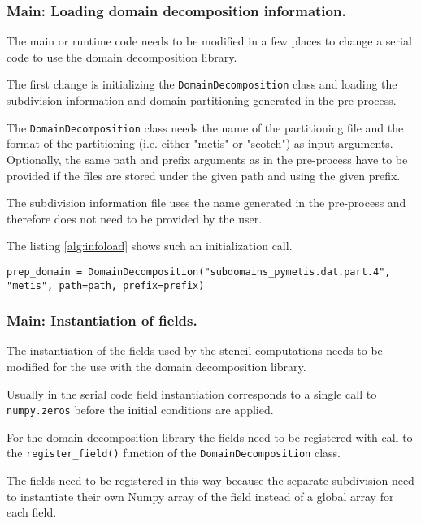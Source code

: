 \subsubsection{Main: Loading domain decomposition information.}
The main or runtime code needs to be modified in a few places to change a serial code to use the domain decomposition library.

The first change is initializing the \texttt{DomainDecomposition} class and loading the subdivision information and domain partitioning generated in the pre-process.

The \texttt{DomainDecomposition} class needs the name of the partitioning file and the format of the partitioning (i.e. either "metis" or "scotch") as input arguments.
Optionally, the same path and prefix arguments as in the pre-process have to be provided if the files are stored under the given path and using the given prefix.

The subdivision information file uses the name generated in the pre-process and therefore does not need to be provided by the user.

The listing \ref{alg:infoload} shows such an initialization call.

\begin{lstlisting}[caption={Example code for the loading of the domain decomposition information.},captionpos=b, label={alg:infoload}, float, floatplacement=H]
prep_domain = DomainDecomposition("subdomains_pymetis.dat.part.4", "metis", path=path, prefix=prefix)
\end{lstlisting}

\subsubsection{Main: Instantiation of fields.}
The instantiation of the fields used by the stencil computations needs to be modified for the use with the domain decomposition library.

Usually in the serial code field instantiation corresponds to a single call to \texttt{numpy.zeros} before the initial conditions are applied.

For the domain decomposition library the fields need to be registered with call to the \texttt{register\_field()} function of the \texttt{DomainDecomposition} class.

The fields need to be registered in this way because the separate subdivision need to instantiate their own Numpy array of the field instead of a global array for each field.

